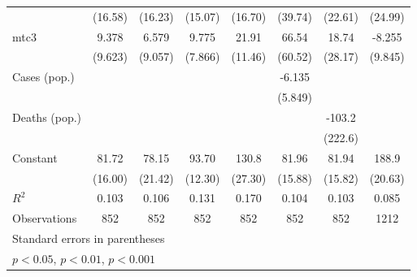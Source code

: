 \documentclass{article}
\begin{document}
{\begin{longtable}{l*{7}{c}}
                &  (16.58)         &  (16.23)         &  (15.07)         &  (16.70)         &  (39.74)         &  (22.61)         &  (24.99)         \\
mtc3            &    9.378         &    6.579         &    9.775         &    21.91         &    66.54         &    18.74         &   -8.255         \\
                &  (9.623)         &  (9.057)         &  (7.866)         &  (11.46)         &  (60.52)         &  (28.17)         &  (9.845)         \\
Cases (pop.)    &                  &                  &                  &                  &   -6.135         &                  &                  \\
                &                  &                  &                  &                  &  (5.849)         &                  &                  \\
Deaths (pop.)   &                  &                  &                  &                  &                  &   -103.2         &                  \\
                &                  &                  &                  &                  &                  &  (222.6)         &                  \\
Constant        &    81.72\sym{**} &    78.15\sym{*}  &    93.70\sym{***}&    130.8\sym{**} &    81.96\sym{**} &    81.94\sym{**} &    188.9\sym{***}\\
                &  (16.00)         &  (21.42)         &  (12.30)         &  (27.30)         &  (15.88)         &  (15.82)         &  (20.63)         \\
\hline
\(R^{2}\)       &    0.103         &    0.106         &    0.131         &    0.170         &    0.104         &    0.103         &    0.085         \\
Observations    &      852         &      852         &      852         &      852         &      852         &      852         &     1212         \\
\hline\hline
\multicolumn{8}{l}{\footnotesize Standard errors in parentheses}\\
\multicolumn{8}{l}{\footnotesize \sym{*} \(p<0.05\), \sym{**} \(p<0.01\), \sym{***} \(p<0.001\)}\\
\end{longtable}
}
\end{document}
